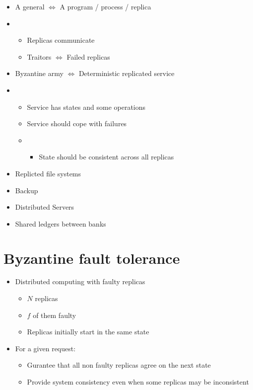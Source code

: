 \documentclass{easyclass}
\begin{document}
\begin{lem}{}
    \begin{itemize}
        \item A general $\Leftrightarrow$ A program / process / replica
        \item \begin{itemize}
            \item Replicas communicate
            \item Traitors $\Leftrightarrow$ Failed replicas
        \end{itemize}
        \item Byzantine army $\Leftrightarrow$ Deterministic replicated service
        \item \begin{itemize}
            \item Service has states and some operations
            \item Service should cope with failures
            \item \begin{itemize}
                \item State should be consistent across all replicas
            \end{itemize}
        \end{itemize}
    \end{itemize}
\end{lem}
\begin{prf}[Applications]{}
    \begin{itemize}
        \item Replicted file systems
        \item Backup
        \item Distributed Servers
        \item Shared ledgers between banks
    \end{itemize}
\end{prf}

\section{Byzantine fault tolerance}
\begin{itemize}
    \item Distributed computing with faulty replicas
     \begin{itemize}
        \item $N$ replicas
        \item $f$ of them faulty
        \item Replicas initially start in the same state
    \end{itemize}
    \item For a given request:
    \begin{itemize}
        \item Gurantee that all non faulty replicas agree on the next state
        \item Provide system consistency even when some replicas may be inconsistent
    \end{itemize}
\end{itemize}
\end{document}
